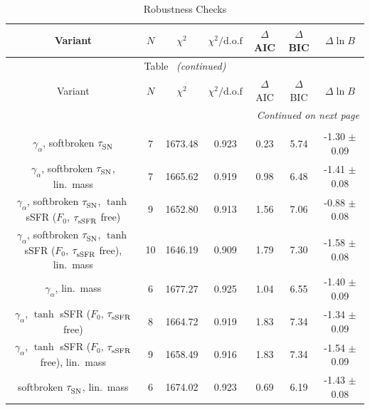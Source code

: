\clearpage
\onecolumngrid
\begin{longtable}{c c c c c c c}
    \caption{Robustness Checks} \label{tab:checks} \\
    \hline
    \hline
    Variant & $N$ & $\chi^2$ & $\chi^2/\mathrm{d.o.f}$ & $\Delta$AIC & $\Delta$BIC & $\Delta\ln B$ \\
    \hline
    \hline
    \endfirsthead
    \multicolumn{7}{c}{Table~\thetable{} \emph{(continued)}} \\
    \hline
    \hline
    Variant & $N$ & $\chi^2$ & $\chi^2/\mathrm{d.o.f}$ & $\Delta$AIC & $\Delta$BIC & $\Delta\ln B$ \\
    \hline
    \hline
    \endhead
    \hline
    \multicolumn{7}{r}{\emph{Continued on next page}} \\
    \endfoot
    \hline
    \endlastfoot
    \multicolumn{7}{c}{\textbf{$w$CDM}} \\
    \hline
    $\gamma_\alpha^{}$, softbroken $\tau_{\rm SN}^{}$ & 7 & 1673.48 & 0.923 & 0.23 & \cellcolor{aicorange}5.74 & \cellcolor{aicorange}-1.30 $\pm$ 0.09 \\
    $\gamma_\alpha^{}$, softbroken $\tau_{\rm SN}^{}$, lin.\ mass & 7 & 1665.62 & 0.919 & 0.98 & \cellcolor{aiclightred}6.48 & \cellcolor{aicorange}-1.41 $\pm$ 0.08 \\
    $\gamma_\alpha^{}$, softbroken $\tau_{\rm SN}^{}$, $\tanh$ sSFR ($F_0$, $\tau_{\rm sSFR}^{}$ free) & 9 & 1652.80 & 0.913 & 1.56 & \cellcolor{aiclightred}7.06 & -0.88 $\pm$ 0.08 \\
    $\gamma_\alpha^{}$, softbroken $\tau_{\rm SN}^{}$, $\tanh$ sSFR ($F_0$, $\tau_{\rm sSFR}^{}$ free), lin.\ mass & 10 & 1646.19 & 0.909 & 1.79 & \cellcolor{aiclightred}7.30 & \cellcolor{aicorange}-1.58 $\pm$ 0.08 \\
    $\gamma_\alpha^{}$, lin.\ mass & 6 & 1677.27 & 0.925 & 1.04 & \cellcolor{aiclightred}6.55 & \cellcolor{aicorange}-1.40 $\pm$ 0.09 \\
    $\gamma_\alpha^{}$, $\tanh$ sSFR ($F_0$, $\tau_{\rm sSFR}^{}$ free) & 8 & 1664.72 & 0.919 & 1.83 & \cellcolor{aiclightred}7.34 & \cellcolor{aicorange}-1.34 $\pm$ 0.09 \\
    $\gamma_\alpha^{}$, $\tanh$ sSFR ($F_0$, $\tau_{\rm sSFR}^{}$ free), lin.\ mass & 9 & 1658.49 & 0.916 & 1.83 & \cellcolor{aiclightred}7.34 & \cellcolor{aicorange}-1.54 $\pm$ 0.09 \\
    softbroken $\tau_{\rm SN}^{}$, lin.\ mass & 6 & 1674.02 & 0.923 & 0.69 & \cellcolor{aiclightred}6.19 & \cellcolor{aicorange}-1.43 $\pm$ 0.08 \\

\end{longtable}
